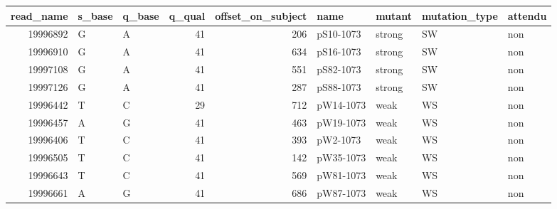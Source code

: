 
\begin{tabular}{r|l|l|r|r|l|l|l|l}
\hline
read\_name & s\_base & q\_base & q\_qual & offset\_on\_subject & name & mutant & mutation\_type & attendu\\
\hline
19996892 & G & A & 41 & 206 & pS10-1073 & strong & SW & non\\
\hline
19996910 & G & A & 41 & 634 & pS16-1073 & strong & SW & non\\
\hline
19997108 & G & A & 41 & 551 & pS82-1073 & strong & SW & non\\
\hline
19997126 & G & A & 41 & 287 & pS88-1073 & strong & SW & non\\
\hline
19996442 & T & C & 29 & 712 & pW14-1073 & weak & WS & non\\
\hline
19996457 & A & G & 41 & 463 & pW19-1073 & weak & WS & non\\
\hline
19996406 & T & C & 41 & 393 & pW2-1073 & weak & WS & non\\
\hline
19996505 & T & C & 41 & 142 & pW35-1073 & weak & WS & non\\
\hline
19996643 & T & C & 41 & 569 & pW81-1073 & weak & WS & non\\
\hline
19996661 & A & G & 41 & 686 & pW87-1073 & weak & WS & non\\
\hline
\end{tabular}

